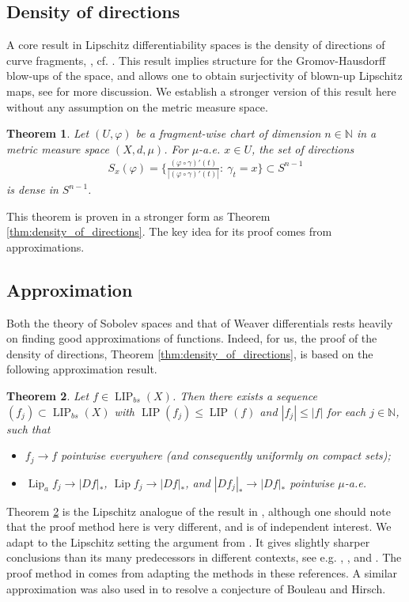 \documentclass{amsart}
\newtheorem{theorem}{Theorem}[section]
\numberwithin{equation}{section}
\newcommand{\N}{\mathbb{N}}
\newcommand{\Lip}{\operatorname{Lip}}
\newcommand{\LIP}{\operatorname{LIP}}
\begin{document}
\subsection{Density of directions} 
A core result in Lipschitz differentiability spaces is the density of directions of curve fragments,  \cite[Theorem 5.3]{che-kle-sch16}, cf. \cite[Theorem 9.5]{bate15}. This result implies structure for the Gromov-Hausdorff blow-ups of the space, and allows one to obtain surjectivity of blown-up Lipschitz maps, see \cite{che-kle-sch16} for more discussion. We establish a stronger version of this result here without any assumption on the metric measure space.

\begin{theorem}\label{thm:density-of-directions-intro}
Let $(U,\varphi)$ be a fragment-wise chart of dimension $n\in\N$ in a metric measure space $(X,d,\mu)$. For $\mu$-a.e. $x\in U$, the set of directions
\begin{align*}
S_x(\varphi)=\bigg\{ \frac{(\varphi\circ\gamma)'(t)}{|(\varphi\circ\gamma)'(t)|}:\ \gamma_t=x\bigg\}\subset S^{n-1}
\end{align*}
is dense in $S^{n-1}$.
\end{theorem}
This theorem is proven in a stronger form as Theorem \ref{thm:density_of_directions}. The key idea for its proof comes from approximations.




\subsection{Approximation} 
Both the theory of Sobolev spaces and that of Weaver differentials rests heavily on finding good approximations of functions. Indeed, for us, the proof of the density of directions, Theorem \ref{thm:density_of_directions}, is based on the following approximation result.
\begin{theorem}\label{thm:approximation}
Let $f\in \LIP_{bs}(X)$. Then there exists a sequence $(f_j)\subset \LIP_{bs}(X)$ with $\LIP(f_j)\le \LIP(f)$ and $|f_j|\le |f|$ for each $j\in\N$, such that
\begin{itemize}
    \item[(1)] $f_j\to f$ pointwise everywhere (and consequently uniformly on compact sets);
    \item[(2)] $\Lip_af_j\to |Df|_\ast$, $\Lip f_j\to |Df|_\ast$, and $|Df_j|_\ast\to |Df|_\ast$ pointwise $\mu$-a.e.
\end{itemize}
\end{theorem}
Theorem \ref{thm:approximation} is the Lipschitz analogue of the result in \cite{amb13}, although one should note that the proof method here is very different, and is of independent interest. We adapt to the Lipschitz setting the argument from \cite{seb2020}. It gives slightly sharper conclusions than its many predecessors in different contexts, see e.g. \cite[Lemma 6.3]{bate15}, \cite[Theorem 1.21]{sch16b}, \cite[Sections 4 and 5]{che99}  and \cite{almar16}. The proof method in \cite{seb2020} comes from adapting the methods in these references. A similar approximation was also used in \cite{eidconj} to resolve a conjecture of Bouleau and Hirsch. 
\end{document}
